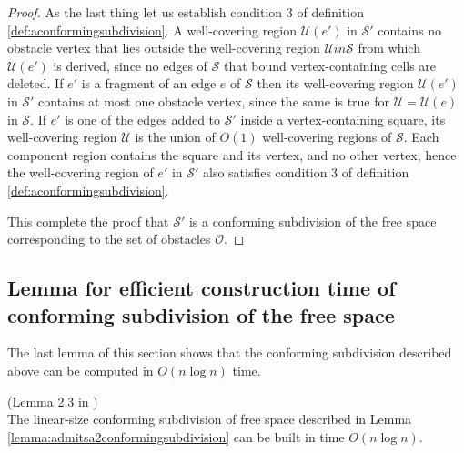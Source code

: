\begin{proof}
As the last thing let us establish condition 3 of definition
\ref{def:aconformingsubdivision}. A well-covering region $\mathcal{U}(e')$ in
$\mathcal{S'}$ contains no obstacle vertex that lies outside the well-covering
region $\mathcal{U} in \mathcal{S}$ from which $\mathcal{U}(e')$ is derived,
since no edges of $\mathcal{S}$ that bound vertex-containing cells are deleted.
If $e'$ is a fragment of an edge $e$ of $\mathcal{S}$ then its well-covering
region $\mathcal{U}(e')$ in $\mathcal{S}'$ contains at most one obstacle
vertex, since the same is true for $\mathcal{U}=\mathcal{U}(e)$ in
$\mathcal{S}$. If $e'$ is one of the edges added to $\mathcal{S}'$ inside a
vertex-containing square, its well-covering region $\mathcal{U}$ is the union
of $O(1)$ well-covering regions of $\mathcal{S}$. Each component region
contains the square and its vertex, and no other vertex, hence the
well-covering region of $e'$ in $\mathcal{S}'$ also satisfies condition 3 of
definition \ref{def:aconformingsubdivision}.

This complete the proof that $\mathcal{S}'$ is a conforming subdivision of the free space corresponding to the set of obstacles $\mathcal{O}$.
\end{proof}

\subsection{Lemma for efficient construction time of conforming subdivision of the free space}

The last lemma of this section shows that the conforming subdivision described above can be computed in $O(n\log n)$ time.

\begin{Lemma} (Lemma 2.3 in \cite{HershbergerS99})\\
The linear-size conforming subdivision of free space described in Lemma \ref{lemma:admitsa2conformingsubdivision} can be built in time $O(n\log n)$.
\end{Lemma}

